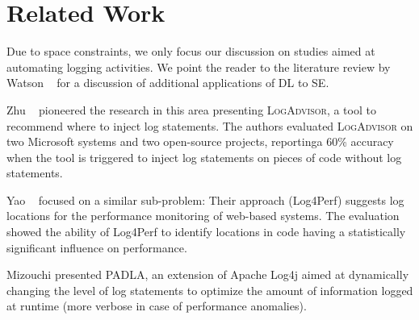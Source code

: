 \section{Related Work} \label{sec:related}

Due to space constraints, we only focus our discussion on studies aimed at automating logging activities. We point the reader to the literature review by Watson \etal~\cite{watson2022systematic} for a discussion of additional applications of DL to SE.



Zhu \etal~\cite{zhu2015learning} pioneered the research in this area presenting \textsc{LogAdvisor}, a tool to recommend where to inject log statements. The authors evaluated \textsc{LogAdvisor} on two Microsoft systems and two open-source projects, reportinga 60\% accuracy when the tool is triggered to inject log statements on pieces of code without log statements.

Yao \etal~\cite{yao2018log4perf} focused on a similar sub-problem: Their approach (Log4Perf) suggests log locations for the performance monitoring of web-based systems. The evaluation showed the ability of Log4Perf to identify locations in code having a statistically significant influence on performance.

Mizouchi \etal \cite{mizouchi2019padla} presented \textsc{PADLA}, an extension of Apache Log4j aimed at dynamically changing the level of log statements to optimize the amount of information logged at runtime (\eg more verbose in case of performance anomalies).


